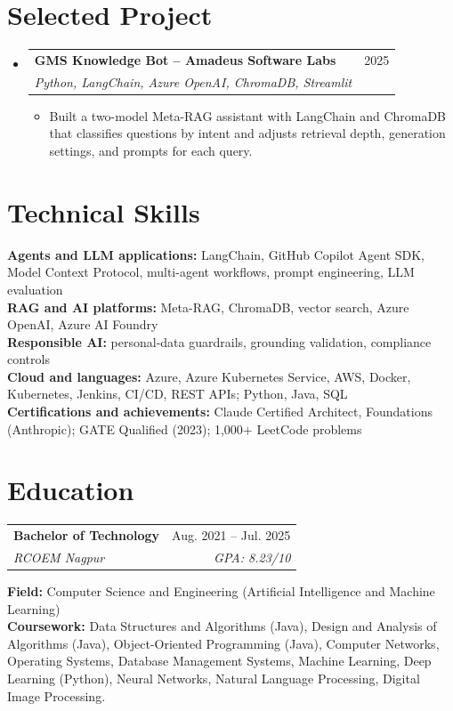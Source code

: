 \documentclass[a4paper,11pt]{article}
\makeatletter
\newcommand{\entry}[4]{\item\begin{tabularx}{\textwidth}{@{}Xr@{}}\textbf{#1}& #2\\\textit{\small #3}&\textit{\small #4}\end{tabularx}\vspace{-5pt}}
\newcommand{\bulletpoint}[1]{\item\small{#1}}
\makeatother
\begin{document}
\section{Selected Project}
\begin{itemize}[leftmargin=0in,label={}]
  \entry{GMS Knowledge Bot -- Amadeus Software Labs}{2025}{Python, LangChain, Azure OpenAI, ChromaDB, Streamlit}{}
  \begin{itemize}
    \bulletpoint{Built a two-model Meta-RAG assistant with LangChain and ChromaDB that classif{}ies questions by intent and adjusts retrieval depth, generation settings, and prompts for each query.}
  \end{itemize}
\end{itemize}

\section{Technical Skills}
\small\textbf{Agents and LLM applications:} LangChain, GitHub Copilot Agent SDK, Model Context Protocol, multi-agent workf{}lows, prompt engineering, LLM evaluation \\
\textbf{RAG and AI platforms:} Meta-RAG, ChromaDB, vector search, Azure OpenAI, Azure AI Foundry \\
\textbf{Responsible AI:} personal-data guardrails, grounding validation, compliance controls \\
\textbf{Cloud and languages:} Azure, Azure Kubernetes Service, AWS, Docker, Kubernetes, Jenkins, CI/CD, REST APIs; Python, Java, SQL \\
\textbf{Certif{}ications and achievements:} Claude Certif{}ied Architect, Foundations (Anthropic); GATE Qualif{}ied (2023); 1,000+ LeetCode problems

\section{Education}
\begin{tabularx}{\textwidth}{@{}Xr@{}}
  \textbf{Bachelor of Technology} & Aug. 2021 -- Jul. 2025 \\
  \textit{\small RCOEM Nagpur} & \textit{\small GPA: 8.23/10} \\
\end{tabularx}
\small\textbf{Field:} Computer Science and Engineering (Artif{}icial Intelligence and Machine Learning)\\
\small\textbf{Coursework:} Data Structures and Algorithms (Java), Design and Analysis of Algorithms (Java), Object-Oriented Programming (Java), Computer Networks, Operating Systems, Database Management Systems, Machine Learning, Deep Learning (Python), Neural Networks, Natural Language Processing, Digital Image Processing.
\end{document}
